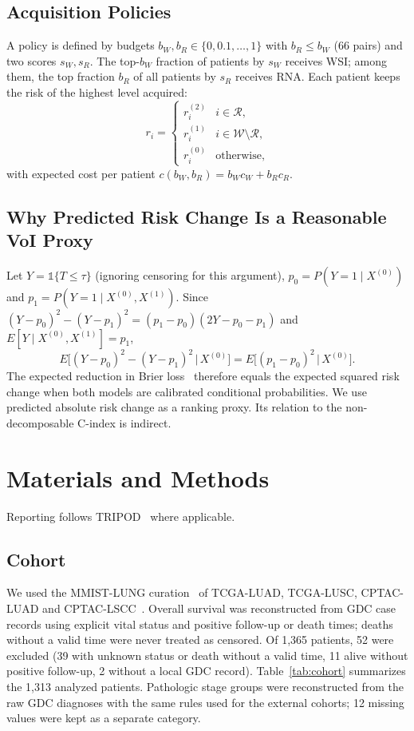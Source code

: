 \documentclass[journal,twoside]{IEEEtran}
\begin{document}
\subsection{Acquisition Policies}
A policy is defined by budgets $b_W, b_R \in \{0, 0.1, \dots, 1\}$ with $b_R \le b_W$ (66 pairs) and two scores $s_W, s_R$. The top-$b_W$ fraction of patients by $s_W$ receives WSI; among them, the top fraction $b_R$ of all patients by $s_R$ receives RNA. Each patient keeps the risk of the highest level acquired:
\begin{equation}
r_i = \begin{cases} r^{(2)}_i & i \in \mathcal{R},\\ r^{(1)}_i & i \in \mathcal{W}\setminus\mathcal{R},\\ r^{(0)}_i & \text{otherwise,}\end{cases}
\end{equation}
with expected cost per patient $c(b_W, b_R) = b_W c_W + b_R c_R$.

\subsection{Why Predicted Risk Change Is a Reasonable VoI Proxy}
\label{sec:voi-theory}
Let $Y = \mathbb{1}\{T \le \tau\}$ (ignoring censoring for this argument), $p_0 = P(Y{=}1 \mid X^{(0)})$ and $p_1 = P(Y{=}1 \mid X^{(0)}, X^{(1)})$. Since $(Y-p_0)^2-(Y-p_1)^2 = (p_1-p_0)(2Y-p_0-p_1)$ and $E[Y \mid X^{(0)},X^{(1)}] = p_1$,
\begin{equation}
E\big[(Y-p_0)^2-(Y-p_1)^2 \,\big|\, X^{(0)}\big] = E\big[(p_1-p_0)^2 \,\big|\, X^{(0)}\big].
\end{equation}
The expected reduction in Brier loss~\cite{brier1950} therefore equals the expected squared risk change when both models are calibrated conditional probabilities. We use predicted absolute risk change as a ranking proxy. Its relation to the non-decomposable C-index is indirect.

\section{Materials and Methods}
\label{sec:methods}
Reporting follows TRIPOD~\cite{collins2015} where applicable.

\subsection{Cohort}
We used the MMIST-LUNG curation~\cite{mendes_mmist} of TCGA-LUAD, TCGA-LUSC, CPTAC-LUAD and CPTAC-LSCC~\cite{tcga_luad,tcga_lusc,gillette2020,satpathy2021}. Overall survival was reconstructed from GDC case records using explicit vital status and positive follow-up or death times; deaths without a valid time were never treated as censored. Of 1,365 patients, 52 were excluded (39 with unknown status or death without a valid time, 11 alive without positive follow-up, 2 without a local GDC record). Table~\ref{tab:cohort} summarizes the 1,313 analyzed patients. Pathologic stage groups were reconstructed from the raw GDC diagnoses with the same rules used for the external cohorts; 12 missing values were kept as a separate category.
\end{document}
